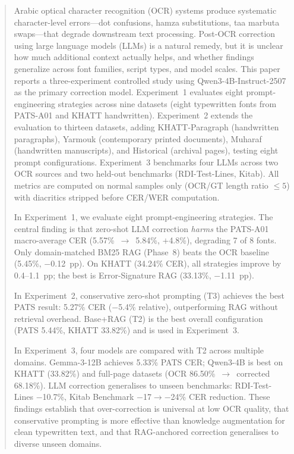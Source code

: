 \documentclass[conference]{IEEEtran}
\begin{document}
\begin{abstract}
Arabic optical character recognition (OCR) systems produce systematic
character-level errors---dot confusions, hamza substitutions, taa marbuta
swaps---that degrade downstream text processing. Post-OCR correction using
large language models (LLMs) is a natural remedy, but it is unclear how much
additional context actually helps, and whether findings generalize across
font families, script types, and model scales.
This paper reports a three-experiment controlled study using
Qwen3-4B-Instruct-2507 as the primary correction model. Experiment~1
evaluates eight prompt-engineering strategies across nine datasets (eight
typewritten fonts from PATS-A01 and KHATT handwritten). Experiment~2
extends the evaluation to thirteen datasets, adding KHATT-Paragraph
(handwritten paragraphs), Yarmouk (contemporary printed documents),
Muharaf (handwritten manuscripts), and Historical (archival pages),
testing eight prompt configurations. Experiment~3 benchmarks four LLMs
across two OCR sources and two held-out benchmarks (RDI-Test-Lines,
Kitab). All metrics are computed on normal samples only (OCR/GT length
ratio $\leq 5$) with diacritics stripped before CER/WER computation.

In Experiment~1, we evaluate eight prompt-engineering strategies.
The central finding is that zero-shot LLM correction \emph{harms} the
PATS-A01 macro-average CER (5.57\%~$\to$~5.84\%, $+$4.8\%), degrading 7 of
8 fonts. Only domain-matched BM25 RAG (Phase~8) beats the OCR baseline
(5.45\%, $-$0.12~pp). On KHATT (34.24\% CER), all strategies improve by
0.4--1.1~pp; the best is Error-Signature RAG (33.13\%, $-$1.11~pp).

In Experiment~2, conservative zero-shot prompting (T3) achieves the best
PATS result: 5.27\% CER ($-$5.4\% relative), outperforming RAG without
retrieval overhead. Base+RAG (T2) is the best overall configuration (PATS
5.44\%, KHATT 33.82\%) and is used in Experiment~3.

In Experiment~3, four models are compared with T2 across multiple domains.
Gemma-3-12B achieves 5.33\% PATS CER; Qwen3-4B is best on KHATT (33.82\%)
and full-page datasets (OCR 86.50\%~$\to$~corrected 68.18\%).
LLM correction generalises to unseen benchmarks: RDI-Test-Lines $-$10.7\%,
Kitab Benchmark $-$17$\to$$-$24\% CER reduction.
These findings establish that over-correction is universal at low OCR quality,
that conservative prompting is more effective than knowledge augmentation for
clean typewritten text, and that RAG-anchored correction generalises to
diverse unseen domains.
\end{abstract}
\end{document}
